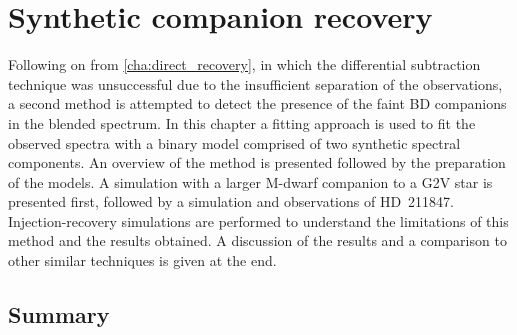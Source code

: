 
\chapter{Synthetic companion recovery}  %
\label{cha:model_comparison}

Following on from \cref{cha:direct_recovery}, in which the differential subtraction technique was unsuccessful due to the insufficient separation of the observations, a second method is attempted to detect the presence of the faint {BD} companions in the blended spectrum.
In this chapter a \textchisquared{} fitting approach is used to fit the observed spectra with a binary model comprised of two synthetic spectral components.
An overview of the method is presented followed by the preparation of the models.
A simulation with a larger M-dwarf companion to a G2V star is presented first, followed by a simulation and observations of {HD~211847}.
Injection-recovery simulations are performed to understand the limitations of this method and the results obtained.
A discussion of the results and a comparison to other similar techniques is given at the end.









\section{Summary}
